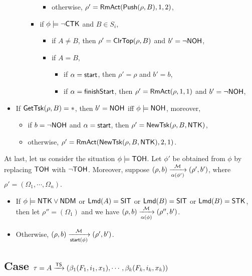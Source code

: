 \begin{itemize}
\begin{itemize}
\begin{itemize}
\begin{itemize}
				\item otherwise, $\rho' = \mathsf{RmAct}(\mathsf{Push}(\rho, B), 1, 2)$,
			\end{itemize}
			\item if $\phi\models\neg{\sf CTK}$ and $B \in S_i$, 
			\begin{itemize}
				\item if $A \neq B$, then $\rho' = \mathsf{ClrTop}(\rho,B)$ and $b' = \neg {\sf NOH}$,
				\item if $A = B$, 
				\begin{itemize}
					\item if $\alpha = {\mathsf{start} }$, then $\rho' = \rho$ and $b' = b$,
					\item if $\alpha = {\mathsf{finishStart} }$, then $\rho' = \mathsf{RmAct}(\rho, 1, 1)$ and $b' = \neg{\sf NOH}$,
				\end{itemize}
			\end{itemize}
		\end{itemize}
	\end{itemize}
	\item If $\mathsf{GetTsk}(\rho,B) = *$, then $b' = {\sf NOH}$ iff $\phi \models {\sf NOH}$, moreover, 
	\begin{itemize}
		\item if $b = \neg {\sf NOH}$ and $\alpha = {\mathsf{start} }$, then $\rho' = \mathsf{NewTsk}(\rho, B, {\sf NTK})$, 
		\item otherwise, $\rho' = \mathsf{RmAct}(\mathsf{NewTsk}(\rho, B, {\sf NTK}), 2, 1)$.
	\end{itemize}				
\end{itemize}

At last, let us consider the situation $\phi \models {\sf TOH}$. Let $\phi'$ be obtained from $\phi$ by replacing ${\sf TOH}$ with $\neg {\sf TOH}$. Moreover, suppose $(\rho, b) \xrightarrow[\alpha(\phi')]{{\mathcal{M} }} (\rho', b')$, where $\rho' = (\Omega_1, \cdots, \Omega_{n})$. 
\begin{itemize}
\item If $\phi \models {\sf NTK} \vee {\sf NDM}$ or ${\sf Lmd}(A) = {\sf SIT}$ or ${\sf Lmd}(B) = {\sf SIT}$ or ${\sf Lmd}(B) = {\sf STK}$, then let $\rho'' = (\Omega_1)$ and we have $(\rho, b) \xrightarrow [\alpha(\phi)] {{\mathcal{M} }} (\rho'', b')$.
%
\item Otherwise, $(\rho, b) \xrightarrow[{\mathsf{start} }(\phi)]{{\mathcal{M} }} (\rho', b')$.
\end{itemize}

\subsection{Case $\tau = A \xrightarrow{{\sf TS}} (\beta_1(F_1, i_1, x_1), \cdots, \beta_k(F_k, i_k, x_k))$}\ 

